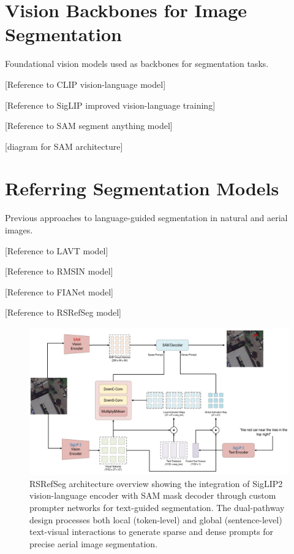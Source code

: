 \section{Vision Backbones for Image Segmentation}

Foundational vision models used as backbones for segmentation tasks.

[Reference to CLIP vision-language model] %

[Reference to SigLIP improved vision-language training] %

[Reference to SAM segment anything model] %

[diagram for SAM architecture]

\section{Referring Segmentation Models}

Previous approaches to language-guided segmentation in natural and aerial images.

[Reference to LAVT model] %

[Reference to RMSIN model] %

[Reference to FIANet model] %

[Reference to RSRefSeg model] %

\begin{figure}[H]
\centering
\includegraphics[width=\textwidth]{./Images/clipsam.png}
\caption{RSRefSeg architecture overview showing the integration of SigLIP2 vision-language encoder with SAM mask decoder through custom prompter networks for text-guided segmentation. The dual-pathway design processes both local (token-level) and global (sentence-level) text-visual interactions to generate sparse and dense prompts for precise aerial image segmentation.}
\label{fig:rsrefseg_architecture}
\end{figure}

